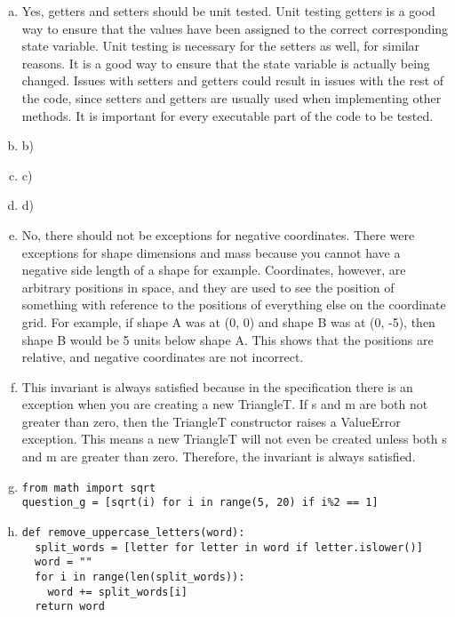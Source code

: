 \documentclass[12pt]{article}
\begin{document}
\begin{enumerate}[a)]

\item Yes, getters and setters should be unit tested. Unit testing getters is a good way to ensure that the values have been assigned to the correct corresponding state variable. Unit testing is necessary for the setters as well, for similar reasons. It is a good way to ensure that the state variable is actually being changed. Issues with setters and getters could result in issues with the rest of the code, since setters and getters are usually used when implementing other methods. It is important for every executable part of the code to be tested.

\item b)

\item c)

\item d)

\item No, there should not be exceptions for negative coordinates. There were exceptions for shape dimensions and mass because you cannot have a negative side length of a shape for example. Coordinates, however, are arbitrary positions in space, and they are used to see the position of something with reference to the positions of everything else on the coordinate grid. For example, if shape A was at (0, 0) and shape B was at (0, -5), then shape B would be 5 units below shape A. This shows that the positions are relative, and negative coordinates are not incorrect.

\item This invariant is always satisfied because in the specification there is an exception when you are creating a new TriangleT. If s and m are both not greater than zero, then the TriangleT constructor raises a ValueError exception. This means a new TriangleT will not even be created unless both s and m are greater than zero. Therefore, the invariant is always satisfied.

\item \begin{lstlisting}
from math import sqrt
question_g = [sqrt(i) for i in range(5, 20) if i%2 == 1]
\end{lstlisting}

\item \begin{lstlisting}
def remove_uppercase_letters(word):
  split_words = [letter for letter in word if letter.islower()]
  word = ""
  for i in range(len(split_words)):
    word += split_words[i]
  return word
\end{lstlisting}


\end{enumerate}
\end{document}
